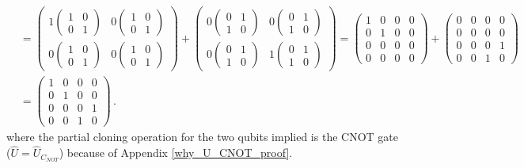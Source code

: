 \documentclass[11pt]{article}
\numberwithin{equation}{section} %
\numberwithin{figure}{section} %
\begin{document}
\begin{appendices}
\begin{equation}
\begin{split}
&=\begin{pmatrix}1\begin{pmatrix}1&0\\0&1\end{pmatrix}&0\begin{pmatrix}1&0\\0&1\end{pmatrix}\\0\begin{pmatrix}1&0\\0&1\end{pmatrix}&0\begin{pmatrix}1&0\\0&1\end{pmatrix}\end{pmatrix}+\begin{pmatrix}0\begin{pmatrix}0&1\\1&0\end{pmatrix}&0\begin{pmatrix}0&1\\1&0\end{pmatrix}\\0\begin{pmatrix}0&1\\1&0\end{pmatrix}&1\begin{pmatrix}0&1\\1&0\end{pmatrix}\end{pmatrix}=\begin{pmatrix}1&0&0&0\\0&1&0&0\\0&0&0&0\\0&0&0&0\end{pmatrix}+\begin{pmatrix}0&0&0&0\\0&0&0&0\\0&0&0&1\\0&0&1&0\end{pmatrix}\\
&=\begin{pmatrix}1&0&0&0\\0&1&0&0\\0&0&0&1\\0&0&1&0\end{pmatrix}\,\textrm{.}
\end{split}
\end{equation}
where the partial cloning operation for the two qubits implied is the CNOT gate ($\hat{U}=\hat{U}_{C_{NOT}}$) because of Appendix \ref{why_U_CNOT_proof}.







\end{appendices}
\end{document}
